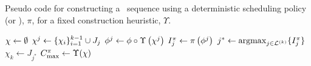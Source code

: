 \begin{algorithm}[t]
    \caption{Pseudo code for constructing a \JSP\ sequence using a 
    deterministic scheduling policy (or \dr), $\pi$, for a fixed construction 
    heuristic, $\Upsilon$.} 
    \label{pseudo:constructJSP}
    \begin{algorithmic}[1]
        \State ${\mathbf{\chi}} \gets \emptyset$  
        \State ${\mathbf{\chi}}^j \gets \{\chi_i\}_{i=1}^{k-1} \cup J_j$ 
        \State ${\mathbf{\phi}}^j \gets {\mathbf{\phi}}\circ\Upsilon\left({\mathbf{\chi}}^j\right)$ 
        \label{pseudo:constructJSP:phi}
        \State $I_j^{\pi} \gets \pi\left({\mathbf{\phi}}^j\right)$ 
        \EndFor
        \State $j^* \gets \mathop{\rm argmax}_{j\in \mathcal{L}^{(k)}}\{I_j^{\pi}\}$ 
        \State $\chi_k \gets J_{j^*}$ 
        \EndFor
        \State \Return $C_{\max}^{\pi} \gets \Upsilon({\mathbf{\chi}})$ 
        \EndProcedure
    \end{algorithmic}
\end{algorithm}